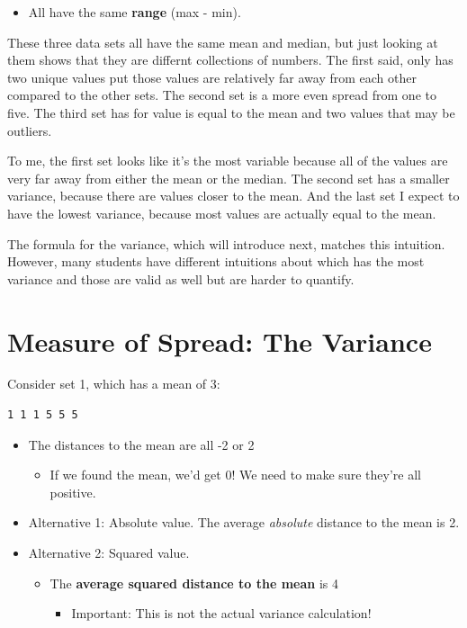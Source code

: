 \documentclass[
  letterpaper,
  DIV=11,
  numbers=noendperiod]{scrreprt}
\providecommand{\tightlist}{%
  \setlength{\itemsep}{0pt}\setlength{\parskip}{0pt}}\usepackage{longtable,booktabs,array}
\begin{document}
\pspace

\begin{itemize}
\tightlist
\item
  All have the same \textbf{range} (max - min).
\end{itemize}

These three data sets all have the same mean and median, but just
looking at them shows that they are differnt collections of numbers. The
first said, only has two unique values put those values are relatively
far away from each other compared to the other sets. The second set is a
more even spread from one to five. The third set has for value is equal
to the mean and two values that may be outliers.

To me, the first set looks like it's the most variable because all of
the values are very far away from either the mean or the median. The
second set has a smaller variance, because there are values closer to
the mean. And the last set I expect to have the lowest variance, because
most values are actually equal to the mean.

The formula for the variance, which will introduce next, matches this
intuition. However, many students have different intuitions about which
has the most variance and those are valid as well but are harder to
quantify.

\hypertarget{measure-of-spread-the-variance}{%
\section{Measure of Spread: The
Variance}\label{measure-of-spread-the-variance}}

Consider set 1, which has a mean of 3:

\begin{verbatim}
1 1 1 5 5 5
\end{verbatim}

\begin{itemize}
\tightlist
\item
  The distances to the mean are all -2 or 2

  \begin{itemize}
  \tightlist
  \item
    If we found the mean, we'd get 0! We need to make sure they're all
    positive.\lspace
  \end{itemize}
\item
  Alternative 1: Absolute value. The average \emph{absolute} distance to
  the mean is 2.\lspace
\item
  Alternative 2: Squared value.

  \begin{itemize}
  \tightlist
  \item
    The \textbf{average squared distance to the mean} is 4

    \begin{itemize}
    \tightlist
    \item
      Important: This is not the actual variance calculation!
    \end{itemize}
  \end{itemize}
\end{itemize}
\end{document}
